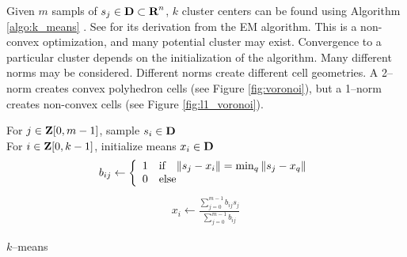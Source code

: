 \documentclass{article}
\begin{document}
Given $m$ sampls of $s_j\in\textbf{D}\subset\textbf{R}^n$, 
$k$ cluster centers can be found using Algorithm \ref{algo:k_means}
\cite[p.~149]{ml}.
See \cite[p.~195]{ml2} for its derivation from the EM algorithm. 
This is a non-convex optimization, 
and many potential cluster may exist.
Convergence to a particular cluster depends on the initialization of the
algorithm.  Many different norms may be considered. 
Different norms create different cell geometries.  
A 2--norm creates convex polyhedron cells (see Figure \ref{fig:voronoi}),
but a 1--norm creates non-convex cells (see Figure \ref{fig:l1_voronoi}).

    \begin{algorithm}[H]
        \SetAlgoLined
        For $j\in \textbf{Z}[0,m-1]$, sample $s_i\in\textbf{D}$\\
        For $i\in\textbf{Z}[0,k-1]$, initialize means $x_i\in\textbf{D}$\\
        {
            {
                \begin{align*}
                    b_{ij}\leftarrow\left\{\begin{array}{lllllllllllllllllll}1&\text{if}\quad \|s_j-x_i\|=\min_q\|s_j-x_q\|
                    \\
                    0 & \text{else}\end{array}\right.
                \end{align*}
            }
            {
                \begin{align*}
                    x_i\leftarrow \frac{\sum_{j=0}^{m-1} b_{ij}s_j}{\sum_{j=0}^{m-1} b_{ij}}
                \end{align*}
            }
        }
    \caption{$k$--means}
    \label{algo:k_means}
    \end{algorithm} 
\end{document}
